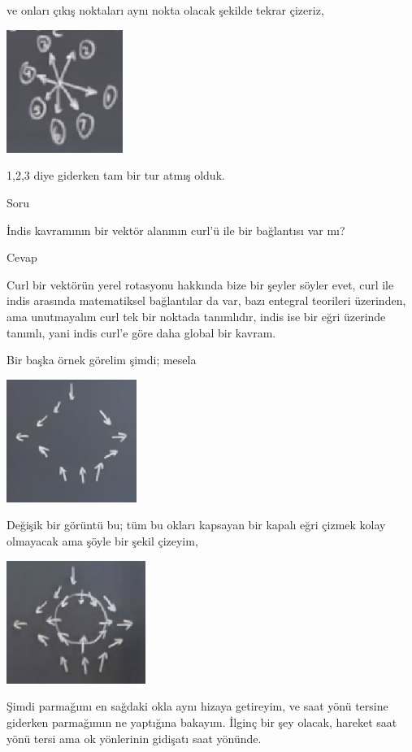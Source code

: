 \documentclass[12pt,fleqn]{article}\usepackage{../../common}
\begin{document}
ve onları çıkış noktaları aynı nokta olacak şekilde tekrar çizeriz,

\includegraphics[height=4cm]{08_15.png}

1,2,3 diye giderken tam bir tur atmış olduk.

Soru

İndis kavramının bir vektör alanının curl'ü ile bir bağlantısı var mı?

Cevap

Curl bir vektörün yerel rotasyonu hakkında bize bir şeyler söyler evet, curl ile
indis arasında matematiksel bağlantılar da var, bazı entegral teorileri
üzerinden, ama unutmayalım curl tek bir noktada tanımlıdır, indis ise bir eğri
üzerinde tanımlı, yani indis curl'e göre daha global bir kavram. 

Bir başka örnek görelim şimdi; mesela

\includegraphics[height=4cm]{08_16.png}

Değişik bir görüntü bu; tüm bu okları kapsayan bir kapalı eğri çizmek kolay
olmayacak ama şöyle bir şekil çizeyim,

\includegraphics[height=4cm]{08_17.png}

Şimdi parmağımı en sağdaki okla aynı hizaya getireyim, ve saat yönü tersine
giderken parmağımın ne yaptığına bakayım. İlginç bir şey olacak, hareket saat
yönü tersi ama ok yönlerinin gidişatı saat yönünde.
\end{document}
